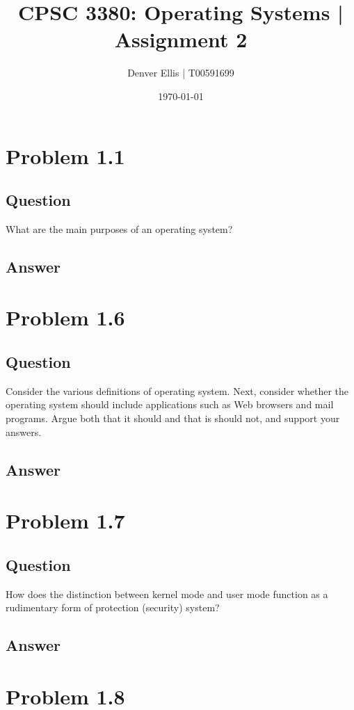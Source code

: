\documentclass[a4paper]{article}
\author{Denver Ellis | T00591699}
\date{\today}
\title{CPSC 3380: Operating Systems | Assignment 2}
\begin{document}
\maketitle

\section{Problem 1.1}
\label{sec:orgbef64ac}
\subsection{Question}
\label{sec:org1ca78ef}
What are the main purposes of an operating system?
\subsection{Answer}
\label{sec:org3591374}
\section{Problem 1.6}
\label{sec:org469fa11}
\subsection{Question}
\label{sec:org37de49c}
Consider the various definitions of operating system. Next, consider whether the operating system should include applications such as Web browsers and mail programs. Argue both that it should and that is should not, and support your answers.
\subsection{Answer}
\label{sec:org7c2c975}
\section{Problem 1.7}
\label{sec:orgc2dbe7e}
\subsection{Question}
\label{sec:org31521cf}
How does the distinction between kernel mode and user mode function as a rudimentary form of protection (security) system?
\subsection{Answer}
\label{sec:org7ee6406}
\section{Problem 1.8}
\label{sec:org0dbd110}
\end{document}
